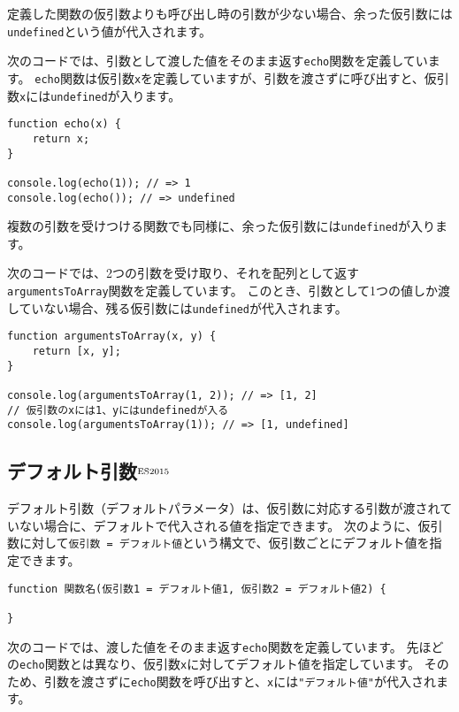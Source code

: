 定義した関数の仮引数よりも呼び出し時の引数が少ない場合、余った仮引数には\texttt{undefined}という値が代入されます。

次のコードでは、引数として渡した値をそのまま返す\texttt{echo}関数を定義しています。
\texttt{echo}関数は仮引数\texttt{x}を定義していますが、引数を渡さずに呼び出すと、仮引数\texttt{x}には\texttt{undefined}が入ります。

\begin{lstlisting}
function echo(x) {
    return x;
}

console.log(echo(1)); // => 1
console.log(echo()); // => undefined
\end{lstlisting}

複数の引数を受けつける関数でも同様に、余った仮引数には\texttt{undefined}が入ります。

次のコードでは、2つの引数を受け取り、それを配列として返す\texttt{argumentsToArray}関数を定義しています。
このとき、引数として1つの値しか渡していない場合、残る仮引数には\texttt{undefined}が代入されます。

\begin{lstlisting}
function argumentsToArray(x, y) {
    return [x, y];
}

console.log(argumentsToArray(1, 2)); // => [1, 2]
// 仮引数のxには1、yにはundefinedが入る
console.log(argumentsToArray(1)); // => [1, undefined]
\end{lstlisting}

\hypertarget{function-default-parameters}{%
\subsection{デフォルト引数{$^{\rm ES2015}$}}\label{function-default-parameters}}

デフォルト引数（デフォルトパラメータ）は、仮引数に対応する引数が渡されていない場合に、デフォルトで代入される値を指定できます。
次のように、仮引数に対して\texttt{仮引数 = デフォルト値}という構文で、仮引数ごとにデフォルト値を指定できます。

\begin{lstlisting}
function 関数名(仮引数1 = デフォルト値1, 仮引数2 = デフォルト値2) {

}
\end{lstlisting}

次のコードでは、渡した値をそのまま返す\texttt{echo}関数を定義しています。
先ほどの\texttt{echo}関数とは異なり、仮引数\texttt{x}に対してデフォルト値を指定しています。
そのため、引数を渡さずに\texttt{echo}関数を呼び出すと、\texttt{x}には\texttt{"デフォルト値"}が代入されます。

